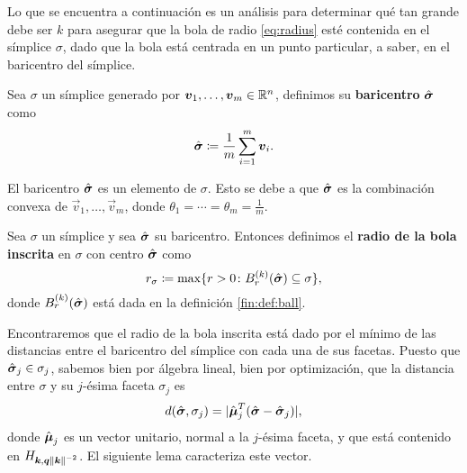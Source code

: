 Lo que se encuentra a continuación es un análisis para determinar qué tan grande debe ser $k$ para
asegurar que la bola de radio \eqref{eq:radius} esté contenida en el símplice $\sigma$, dado que la
bola está centrada en un punto particular, a saber, en el baricentro del símplice.

\begin{definition}
	\label{def:barycenter}
	Sea $\sigma$ un símplice generado por $\boldsymbol{v}_1, \ldots, \boldsymbol{v}_m \in \mathbb{R}^n$, definimos su
	\textbf{baricentro} $\hat{\boldsymbol{ \sigma }}$ como
	\begin{equation*}
		\hat{\boldsymbol{ \sigma }} \coloneq \frac{1}{m} \sum_{i=1}^{m}\boldsymbol{v}_i.
	\end{equation*}
\end{definition}
\begin{observation}
	El baricentro $\hat{\boldsymbol{ \sigma }}$ es un elemento de $\sigma$. Esto se debe a que $\hat{\boldsymbol{ \sigma }}$ es la
	combinación convexa de $\vec{v}_1, \ldots, \vec{v}_m$, donde $\theta_1 = \cdots = \theta_m =
	\frac{1}{m}$.
\end{observation}

\begin{definition}
	\label{def:r-sigma}
	Sea $\sigma$ un símplice y sea $\hat{\boldsymbol{ \sigma }}$ su baricentro. Entonces definimos el \textbf{radio
	de la bola inscrita} en $\sigma$ con centro $\hat{\boldsymbol{ \sigma }}$ como
	\begin{equation}
		\label{eq:def:r-sigma}
		r_\sigma \coloneq \max \lbrace r > 0 \colon B_r^{(k)}(\hat{\boldsymbol{ \sigma }})
		\subseteq \sigma \rbrace,
	\end{equation}
	donde $B_r^{(k)}(\hat{\boldsymbol{ \sigma }})$ está dada en la definición \ref{fin:def:ball}.
\end{definition}

Encontraremos que el radio de la bola inscrita está dado por el mínimo de las distancias
entre el baricentro del símplice con cada una de sus facetas. Puesto que $\hat{\boldsymbol{ \sigma }}_j \in
\sigma_j$, sabemos bien por álgebra lineal, bien por optimización, que la distancia entre $\sigma$ y
su $j$-ésima faceta $\sigma_j$ es
\begin{equation}
	\label{eq:dist:v1}
	d(\hat{\boldsymbol{ \sigma }}, \sigma_j) = |\hat{\boldsymbol{\mu}}_j^T(\hat{\boldsymbol{ \sigma }} - \hat{\boldsymbol{ \sigma }}_j)|,
\end{equation}
donde $\hat{\boldsymbol{\mu}}_j$ es un vector unitario, normal a la $j$-ésima faceta, y que
está contenido en $H_{\boldsymbol{k}, \boldsymbol{q}\left\lVert \boldsymbol{k} \right\rVert^{-2}}$. El siguiente lema caracteriza este vector.

